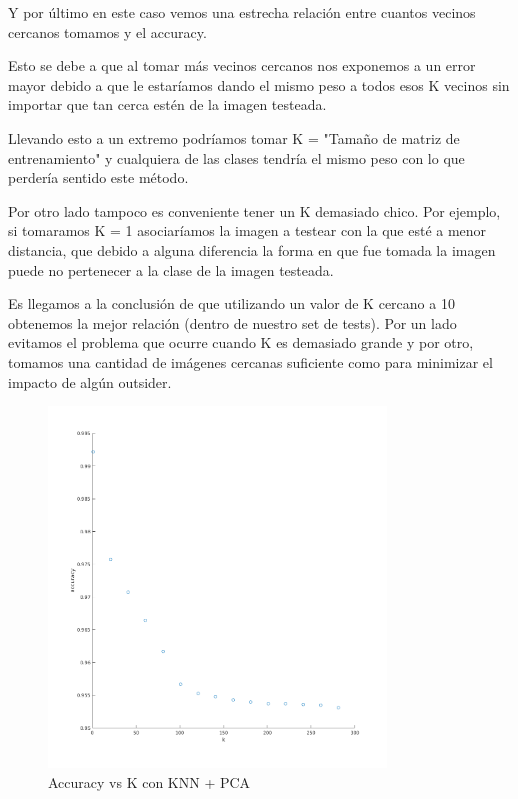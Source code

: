 Y por último en este caso vemos una estrecha relación entre cuantos vecinos cercanos tomamos y el accuracy.

Esto se debe a que al tomar más vecinos cercanos nos exponemos a un error mayor debido a que le estaríamos dando el mismo peso a todos esos K vecinos sin importar que tan cerca estén de la imagen testeada.

Llevando esto a un extremo podríamos tomar K = "Tamaño de matriz de entrenamiento" y cualquiera de las clases tendría el mismo peso con lo que perdería sentido este método.

Por otro lado tampoco es conveniente tener un K demasiado chico. Por ejemplo, si tomaramos K = 1 asociaríamos la imagen a testear con la que esté a menor distancia, que debido a alguna diferencia la forma en que fue tomada la imagen puede no pertenecer a la clase de la imagen testeada.

Es llegamos a la conclusión de que utilizando un valor de K cercano a 10 obtenemos la mejor relación (dentro de nuestro set de tests).
Por un lado evitamos el problema que ocurre cuando K es demasiado grande y por otro, tomamos una cantidad de imágenes cercanas suficiente como para minimizar el impacto de algún outsider.
\begin{figure}[H]
	\centering
	\includegraphics[width=0.8\textwidth]{img/k_pca_accu.png}
	\caption{Accuracy vs K con KNN + PCA}
	\label{fig:K vs Accuracy con KNN + PCA}
\end{figure}


